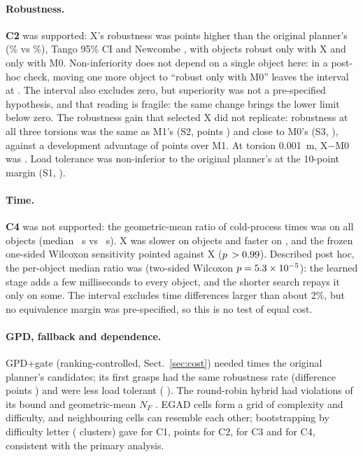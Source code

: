 \paragraph{Robustness.} \textbf{C2} was supported: X's robustness was \nxCtwoEff{} points higher than the original planner's (\nxRobX\% vs \nxRobMzero\%), Tango 95\% CI \nxCtwoCI{} and Newcombe \nxCtwoNewcombe, with \nxCtwoFav{} objects robust only with X and \nxCtwoUnfav{} only with M0. Non-inferiority does not depend on a single object here: in a post-hoc check, moving one more object to ``robust only with M0'' leaves the interval at \phCtwoOneMoreCI. The interval also excludes zero, but superiority was not a pre-specified hypothesis, and that reading is fragile: the same change brings the lower limit below zero. The robustness gain that selected X did not replicate: robustness at all three torsions was the same as M1's (S2, \nxStwoEff{} points \nxStwoCI) and close to M0's (S3, \nxSthreeEff{} \nxSthreeCI), against a development advantage of \vAdv{} points over M1. At torsion 0.001~m, X$-$M0 was \nxTorLow{} \nxTorLowCI. Load tolerance was non-inferior to the original planner's at the 10-point margin (S1, \nxSoneEff{} \nxSoneCI).

\paragraph{Time.} \textbf{C4} was not supported: the geometric-mean ratio of cold-process times was \nxCfourEff{} \nxCfourCI{} on all \nxObjects{} objects (median \nxTimeX~s vs \nxTimeMzero~s). X was slower on \nxCfourMore{} objects and faster on \nxCfourFewer, and the frozen one-sided Wilcoxon sensitivity pointed against X ($p\,>0.99$). Described post hoc, the per-object median ratio was \phCfourMedian{} (two-sided Wilcoxon $p=5.3\times 10^{-5}$): the learned stage adds a few milliseconds to every object, and the shorter search repays it only on some. The interval excludes time differences larger than about 2\%, but no equivalence margin was pre-specified, so this is no test of equal cost.

\paragraph{GPD, fallback and dependence.} GPD+gate (ranking-controlled, Sect.~\ref{sec:cost}) needed \nxGPDNF{} \nxGPDNFCI{} times the original planner's candidates; its first grasps had the same robustness rate (difference \nxGPDRob{} points \nxGPDRobCI) and were less load tolerant (\nxGPDLoad{} \nxGPDLoadCI). The round-robin hybrid had \nxFbViol{} violations of its bound and geometric-mean $N_F$ \nxHybridNF. EGAD cells form a grid of complexity and difficulty, and neighbouring cells can resemble each other; bootstrapping by difficulty letter (\nxClusters{} clusters) gave \nxClusterCone{} for C1, \nxClusterCtwo{} points for C2, \nxClusterCthree{} for C3 and \nxClusterCfour{} for C4, consistent with the primary analysis.
